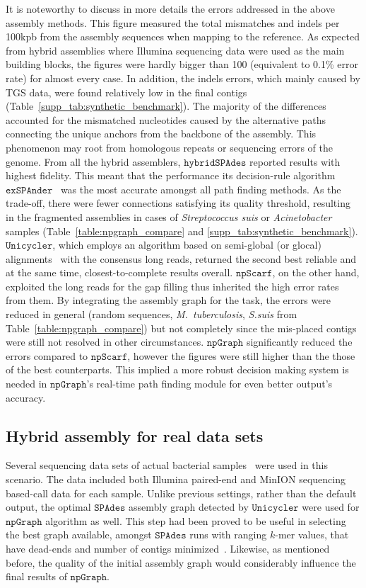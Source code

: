 \documentclass[10pt,twocolumn,twoside]{genpaper}
\newcommand{\npscarf}{$\mathtt{npScarf}$}
\newcommand{\npgraph}{$\mathtt{npGraph}$}
\newcommand{\unicycler}{$\mathtt{Unicycler}$}
\newcommand{\spades}{$\mathtt{SPAdes}$}
\begin{document}
It is noteworthy to discuss in more details the errors addressed in the above assembly methods.
This figure measured the total mismatches and indels per 100kpb from the assembly sequences when mapping to the reference.
As expected from hybrid assemblies where Illumina sequencing data were used as the main building blocks, the figures were hardly bigger than 100 (equivalent to 0.1\% error rate) for almost every case.
In addition, the indels errors, which mainly caused by TGS data, were found relatively low in the final contigs (Table~\ref{supp_tab:synthetic_benchmark}).
The majority of the differences accounted for the mismatched nucleotides caused by the alternative paths connecting the unique anchors from the backbone of the assembly.
This phenomenon may root from homologous repeats or sequencing errors of the genome.
From all the hybrid assemblers, $\mathtt{hybridSPAdes}$ reported results with highest fidelity. This meant that the performance its decision-rule algorithm $\mathtt{exSPAnder}$~\cite{Prjibelski2014} was the most accurate amongst all path finding methods. As the trade-off, there were fewer connections satisfying its quality threshold, resulting in the fragmented assemblies in cases of \emph{Streptococcus suis} or \emph{Acinetobacter} samples (Table~\ref{table:npgraph_compare} and \ref{supp_tab:synthetic_benchmark}).
\unicycler{}, which employs an algorithm based on semi-global (or glocal) alignments~\cite{Brudno2003glocal} with the consensus long reads, returned the second best reliable and at the same time, closest-to-complete results overall.
\npscarf{}, on the other hand, exploited the long reads for the gap filling thus inherited the high error rates from them.
By integrating the assembly graph for the task, the errors were reduced in general (random sequences, \emph{M.~tuberculosis}, \emph{S.suis} from Table~\ref{table:npgraph_compare}) but not completely since the mis-placed contigs were still not resolved in other circumstances.
\npgraph{} significantly reduced the errors compared to \npscarf{}, however the figures were still higher than the those of the best counterparts.
This implied a more robust decision making system is needed in \npgraph{}'s real-time path finding module for even better output's accuracy.

\subsection*{Hybrid assembly for real data sets}
Several sequencing data sets of actual bacterial samples~\cite{George2017M14} were used in this scenario.
The data included both Illumina paired-end and MinION sequencing based-call data for each sample.
Unlike previous settings, rather than the default output, the optimal \spades{} assembly graph detected by \unicycler{} were used for \npgraph{} algorithm as well.
This step had been proved to be useful in selecting the best graph available, amongst \spades{} runs with ranging $k$-mer values, that have dead-ends and number of contigs minimized~\cite{Wick2017unicycler}. Likewise, as mentioned before, the quality of the initial assembly graph would considerably influence the final results of \npgraph{}. 
\end{document}
